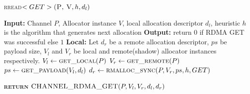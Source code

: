 \documentclass[10pt]{article}
\begin{document}
\begin{algorithm}{}
\footnotesize
\caption{\textsc{rread}{$<GET>\textsc{(P, V}, h, d_l)$}}
\label{alg:rread_GET} 
\begin{algorithmic}[1]


\STATE \textbf{Input:} Channel $P$, Allocator instance $V$, local allocation descriptor $d_l$,  heuristic $h$ is the algorithm that generates next allocation
\STATE \textbf{Output:} return {$0$} if RDMA GET was successful else {$1$}
\STATE \textbf{Local:} Let $d_r$ be a remote allocation descriptor,  $ps$ be payload size, $V_l$ and $V_r$ be local and remote(shadow) allocator instances respectively.
\STATE \quad $\textbf{$V_l$} \leftarrow  \textsc{get\_local}(P)$ 
\STATE \quad $\textbf{$V_r$} \leftarrow  \textsc{get\_remote}(P)$ 
\STATE \quad $\textbf{$ps$} \leftarrow  \textsc{get\_payload}(V_l, d_l)$ 
\STATE \quad $\textbf{$d_r$} \leftarrow  \textsc{rmalloc\_sync}(P, V_r, ps, h, GET)$ 

\STATE \textsc{\textbf{return}} {$\textsc{CHANNEL\_RDMA\_GET}(P, V_l, V_r, d_l, d_r)$}
\STATE


\end{algorithmic}
\end{algorithm}
\end{document}
